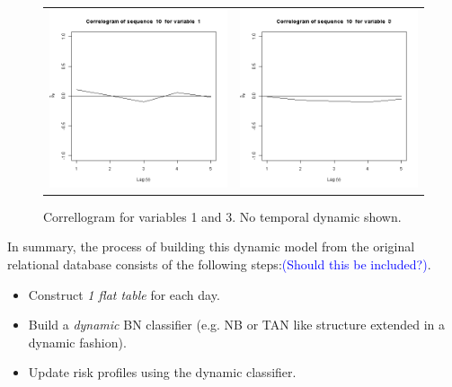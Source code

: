 \begin{figure}
  \centering
    \begin{tabular}{cc}
    \includegraphics[width=70mm]{figures/CajaMarcrl1}&
     \includegraphics[width=70mm]{figures/CajaMarcrl3}\\
  \end{tabular}
    \caption{\label{fig:cajamarCorr}Correllogram for variables 1 and 3. No temporal dynamic shown.}
\end{figure}


In summary, the process of building this dynamic model from the original relational database consists of the following steps:\textcolor{blue}{(Should this be included?)}.

\begin{itemize}
\item Construct \emph{1 flat table} for each day.
\item Build a \emph{dynamic} BN classifier (e.g. NB or TAN like structure extended in a dynamic fashion). 
\item Update risk profiles using the dynamic classifier.
\end{itemize}


